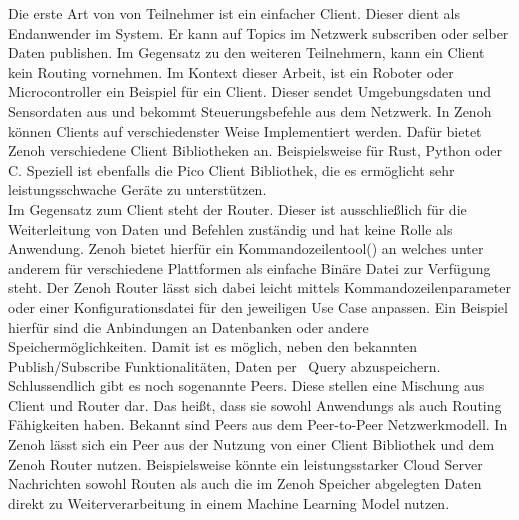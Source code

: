 Die erste Art von von Teilnehmer ist ein einfacher Client. Dieser dient als Endanwender im System. Er kann auf Topics im Netzwerk subscriben oder selber Daten publishen. Im Gegensatz zu den weiteren Teilnehmern, kann ein Client kein Routing vornehmen. Im Kontext dieser Arbeit, ist ein Roboter oder Microcontroller ein Beispiel für ein Client. Dieser sendet Umgebungsdaten und Sensordaten aus und bekommt Steuerungsbefehle aus dem Netzwerk. In Zenoh können Clients auf verschiedenster Weise Implementiert werden. Dafür bietet Zenoh verschiedene Client Bibliotheken an. Beispielsweise für Rust, Python oder C. Speziell ist ebenfalls die Pico Client Bibliothek, die es ermöglicht sehr leistungsschwache Geräte zu unterstützen.\\
Im Gegensatz zum Client steht der Router. Dieser ist ausschließlich für die Weiterleitung von Daten und Befehlen zuständig und hat keine Rolle als Anwendung. Zenoh bietet hierfür ein Kommandozeilentool() an welches unter anderem für verschiedene Plattformen als einfache Binäre Datei zur Verfügung steht. Der Zenoh Router lässt sich dabei leicht mittels Kommandozeilenparameter oder einer Konfigurationsdatei für den jeweiligen Use Case anpassen. Ein Beispiel hierfür sind die Anbindungen an Datenbanken oder andere Speichermöglichkeiten. Damit ist es möglich, neben den bekannten Publish/Subscribe Funktionalitäten, Daten per  Query abzuspeichern.\\
Schlussendlich gibt es noch sogenannte Peers. Diese stellen eine Mischung aus Client und Router dar. Das heißt, dass sie sowohl Anwendungs als auch Routing Fähigkeiten haben. Bekannt sind Peers aus dem Peer-to-Peer Netzwerkmodell. In Zenoh lässt sich ein Peer aus der Nutzung von einer Client Bibliothek und dem Zenoh Router nutzen. Beispielsweise könnte ein leistungsstarker Cloud Server Nachrichten sowohl Routen als auch die im Zenoh Speicher abgelegten Daten direkt zu Weiterverarbeitung in einem Machine Learning Model nutzen.\\

